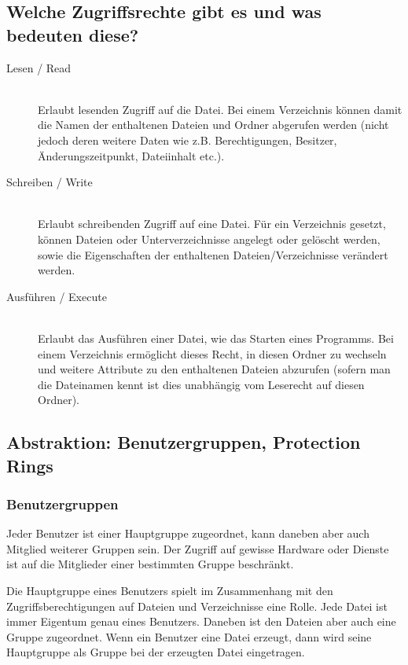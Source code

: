 \documentclass{scrartcl}
\begin{document}
\subsection*{Welche Zugriffsrechte gibt es und was bedeuten diese?}
\begin{description}
  \item[Lesen / Read] \hfill \\
    Erlaubt lesenden Zugriff auf die Datei. Bei einem Verzeichnis können damit
    die Namen der enthaltenen Dateien und Ordner abgerufen werden (nicht jedoch
    deren weitere Daten wie z.B. Berechtigungen, Besitzer, Änderungszeitpunkt,
    Dateiinhalt etc.).
  \item[Schreiben / Write] \hfill \\
    Erlaubt schreibenden Zugriff auf eine Datei. Für ein Verzeichnis gesetzt,
    können Dateien oder Unterverzeichnisse angelegt oder gelöscht werden, sowie
    die Eigenschaften der enthaltenen Dateien/Verzeichnisse verändert werden.
  \item[Ausführen / Execute] \hfill \\
    Erlaubt das Ausführen einer Datei, wie das Starten eines Programms. Bei
    einem Verzeichnis ermöglicht dieses Recht, in diesen Ordner zu wechseln und
    weitere Attribute zu den enthaltenen Dateien abzurufen (sofern man die
    Dateinamen kennt ist dies unabhängig vom Leserecht auf diesen Ordner).
\end{description}

\subsection*{Abstraktion: Benutzergruppen, Protection Rings}
\subsubsection*{Benutzergruppen}
Jeder Benutzer ist einer Hauptgruppe zugeordnet, kann daneben aber auch
Mitglied weiterer Gruppen sein. Der Zugriff auf gewisse Hardware oder Dienste
ist auf die Mitglieder einer bestimmten Gruppe beschränkt.

Die Hauptgruppe eines Benutzers spielt im Zusammenhang mit den
Zugriffsberechtigungen auf Dateien und Verzeichnisse eine Rolle. Jede Datei ist
immer Eigentum genau eines Benutzers. Daneben ist den Dateien aber auch eine
Gruppe zugeordnet. Wenn ein Benutzer eine Datei erzeugt, dann wird seine
Hauptgruppe als Gruppe bei der erzeugten Datei eingetragen.
\end{document}
